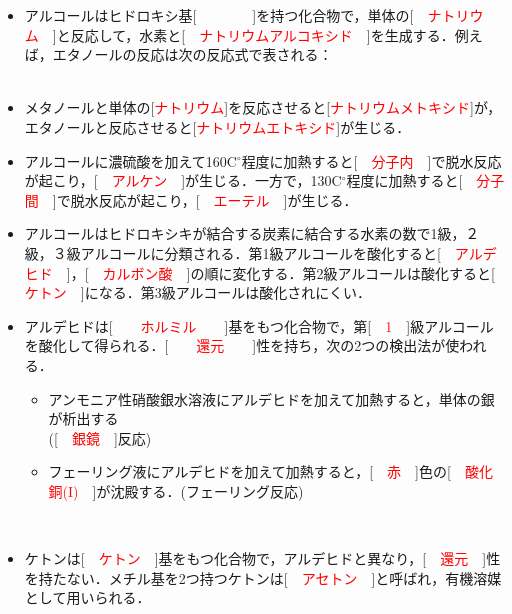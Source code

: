 \documentclass[a4paper,11pt]{ltjsarticle}
\title{}
\author{}
\date{}
\begin{document}
\pagestyle{empty}
\begin{itemize}
    \item アルコールはヒドロキシ基[　　\textcolor{red}{}　　]を持つ化合物で，単体の[　\textcolor{red}{ナトリウム}　]と反応して，水素と[　\textcolor{red}{ナトリウムアルコキシド}　]を生成する．例えば，エタノールの反応は次の反応式で表される：\\
    \\
    \item メタノールと単体の[\textcolor{red}{ナトリウム}]を反応させると[\textcolor{red}{ナトリウムメトキシド}]が，エタノールと反応させると[\textcolor{red}{ナトリウムエトキシド}]が生じる．\\
    \item アルコールに濃硫酸を加えて160C$^\circ$程度に加熱すると[　\textcolor{red}{分子内}　]で脱水反応が起こり，[　\textcolor{red}{アルケン}　]が生じる．一方で，130C$^\circ$程度に加熱すると[　\textcolor{red}{分子間}　]で脱水反応が起こり，[　\textcolor{red}{エーテル}　]が生じる．\\
    \item アルコールはヒドロキシキが結合する炭素に結合する水素の数で1級，２級，３級アルコールに分類される．第1級アルコールを酸化すると[　\textcolor{red}{アルデヒド}　]，[　\textcolor{red}{カルボン酸}　]の順に変化する．第2級アルコールは酸化すると[　\textcolor{red}{ケトン}　]になる．第3級アルコールは酸化されにくい．\\
    \item アルデヒドは[　　\textcolor{red}{ホルミル}　　]基をもつ化合物で，第[　\textcolor{red}{1}　]級アルコールを酸化して得られる．[　　\textcolor{red}{還元}　　]性を持ち，次の2つの検出法が使われる．\begin{itemize}
        \item アンモニア性硝酸銀水溶液にアルデヒドを加えて加熱すると，単体の銀が析出する\\([　\textcolor{red}{銀鏡}　]反応)
              \item フェーリング液にアルデヒドを加えて加熱すると，[　\textcolor{red}{赤}　]色の[　\textcolor{red}{酸化銅(I)}　]が沈殿する．(フェーリング反応)
    \end{itemize}
    　\\
    \item ケトンは[　\textcolor{red}{ケトン}　]基をもつ化合物で，アルデヒドと異なり，[　\textcolor{red}{還元}　]性を持たない．メチル基を2つ持つケトンは[　\textcolor{red}{アセトン}　]と呼ばれ，有機溶媒として用いられる．\\
  
\end{itemize}
\end{document}
